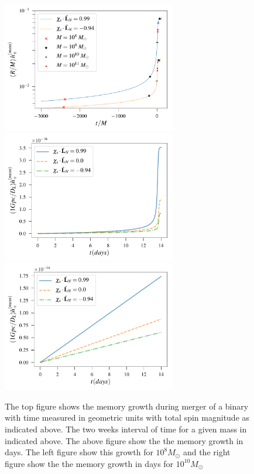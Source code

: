 \documentclass[twocolumn,showpacs,aps,prd,nobibnotes,floatfix]{revtex4-1}
\begin{document}
\begin{widetext}
\begin{figure}
	\includegraphics[width=3.0in]{../plots/PlotfromMathematicaData/MemoryGrowth2weeksGeoUnits.pdf}
	\includegraphics[width=3.0in]{../plots/PlotfromMathematicaData/MemoryGrowth2weeksInDays10pow8MSun.pdf}
	\includegraphics[width=3.0in]{../plots/PlotfromMathematicaData/MemoryGrowth2weeksInDays10pow10MSun.pdf}
	\caption{The top figure shows the memory growth during merger of a binary with time measured in geometric units with total spin magnitude as indicated above. The two weeks interval of time for a given mass in indicated above. The above figure show the the memory growth in days. The left figure show this growth for $10^{8} M_{\odot}$ and the right figure show the the memory growth in days for $10^{10} M_{\odot}$}
	\label{fig:resedualGrowth}
\end{figure} 
\end{widetext}
\end{document}
